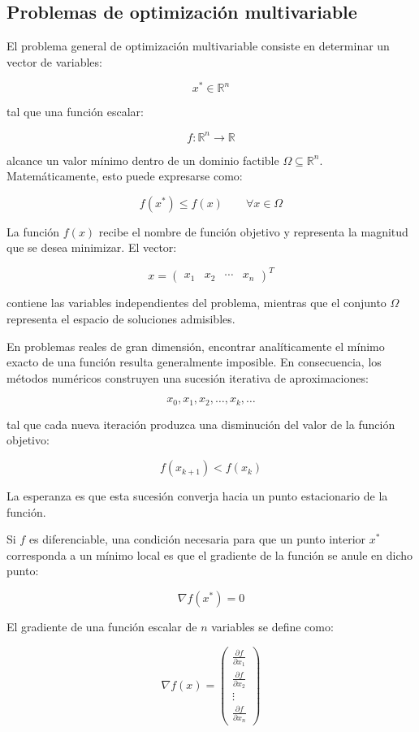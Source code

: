 \subsection{Problemas de optimización multivariable}

El problema general de optimización multivariable consiste en determinar un vector de variables:

\[
x^* \in \mathbb{R}^n
\]

tal que una función escalar:

\[
f : \mathbb{R}^n \rightarrow \mathbb{R}
\]

alcance un valor mínimo dentro de un dominio factible \(\Omega \subseteq \mathbb{R}^n\). Matemáticamente, esto puede expresarse como:

\[
f(x^*) \leq f(x)
\qquad
\forall x \in \Omega
\]

La función \(f(x)\) recibe el nombre de función objetivo y representa la magnitud que se desea minimizar. El vector:

\[
x =
\begin{pmatrix}
x_1 & x_2 & \cdots & x_n
\end{pmatrix}^T
\]

contiene las variables independientes del problema, mientras que el conjunto \(\Omega\) representa el espacio de soluciones admisibles.

En problemas reales de gran dimensión, encontrar analíticamente el mínimo exacto de una función resulta generalmente imposible. En consecuencia, los métodos numéricos construyen una sucesión iterativa de aproximaciones:

\[
x_0, x_1, x_2, \dots , x_k , \dots
\]

tal que cada nueva iteración produzca una disminución del valor de la función objetivo:

\[
f(x_{k+1}) < f(x_k)
\]

La esperanza es que esta sucesión converja hacia un punto estacionario de la función.

Si \(f\) es diferenciable, una condición necesaria para que un punto interior \(x^*\) corresponda a un mínimo local es que el gradiente de la función se anule en dicho punto:

\[
\nabla f(x^*) = 0
\]

El gradiente de una función escalar de \(n\) variables se define como:

\[
\nabla f(x) =
\begin{pmatrix}
\frac{\partial f}{\partial x_1} \\
\frac{\partial f}{\partial x_2} \\
\vdots \\
\frac{\partial f}{\partial x_n}
\end{pmatrix}
\]


